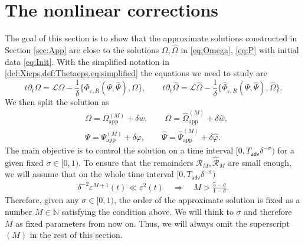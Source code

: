 \documentclass[11pt,reqno,a4paper]{amsart}
\def\eps{\varepsilon}
\def\de{{\partial}}
\def\NN {\mathbb{N}}
\newcommand{\cL}{\mathcal{L}}
\newcommand{\cR}{\mathcal{R}}
\newcommand{\adv}{\mathsf{adv}}
\newcommand{\app}{\mathrm{app}}
\newcommand{\1}{\mathbbm{1}}
\theoremstyle{definition}
\theoremstyle{definition}
\numberwithin{equation}{section}
\begin{document}
\section{The nonlinear corrections}
\label{sec:nonlinear}
The goal of this section is to show that the approximate solutions constructed in Section \ref{sec:App} are close to the solutions $\Omega,\widehat{\Omega}$ in \cref{eq:Omega}, \cref{eq:P} with initial data \cref{eq:Init}. With the simplified notation in \cref{def:Xieps,def:Thetaeps,eq:simplified} the equations we need to study are 
\begin{equation}
\label{eq:NL0}
t\de_t\Omega=\cL\Omega-\frac{1}{\delta}\{\Phi_{\eps,R}(\Psi,\widehat{\Psi}),\Omega\},\qquad t\de_t\widehat{\Omega}=\cL \widehat{\Omega}-\frac{1}{\delta}\{\widehat{\Phi}_{\eps,R}(\Psi,\widehat{\Psi}),\widehat{\Omega}\}.
\end{equation}We then split the solution as 
\begin{align}
\label{def:NLsplitting}
&\Omega=\Omega_{\app}^{(M)}+\delta  w,   \qquad \widehat{\Omega}=\widehat \Omega_{\app}^{(M)}+\delta \widehat{w},\\
    &\Psi=\Psi_{\app}^{(M)}+ \delta \varphi,   \qquad \widehat{\Psi}=\widehat{\Psi}_{\app}^{(M)}+\delta \widehat{\varphi}.
\end{align}
The main objective is to control the solution on a time interval $[0,T_{\adv}\delta^{-\sigma})$ for a given fixed $\sigma\in [0,1)$. To ensure that the remainders $\cR_{M},\widehat{\cR}_M$ are small enough, we will  assume that on the whole time interval $[0,T_{\adv}\delta^{-\sigma})$
\begin{align}
\label{fixM}
    \delta^{-2}\eps^{M+1}(t)\ll  \eps^2(t) \quad \Longrightarrow \quad M>\frac{5-\sigma}{1-\sigma}.
\end{align}
Therefore, given any $\sigma\in[0,1)$, the order of the approximate solution is fixed as a number $M\in \NN$ satisfying the condition above. We will think to $\sigma$ and therefore $M$ as fixed parameters from now on. Thus, we will always omit the superscript $(M)$ in the rest of this section.
\end{document}
